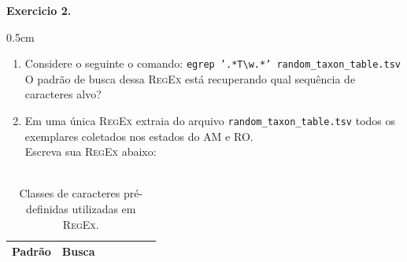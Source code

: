 \begin{refsection}
\begin{blackBlock}{\textbf{Exercicio 2.}}
\begin {myindentpar}{0.5cm}
\begin{enumerate}[\itshape i.]
 \item{Considere o seguinte o comando: \texttt{egrep '.*T\textbackslash w.*' random\_taxon\_table.tsv}}\label{tut2:regex:modifiers:ex2}\\
	O padrão de busca dessa \textsc{RegEx} está recuperando qual sequência de caracteres alvo?\\

 \item{Em uma única \textsc{RegEx} extraia do arquivo \texttt{random\_taxon\_table.tsv} todos os exemplares coletados nos estados do AM e RO.}\label{tut2:regex:modifiers:ex3}\\
	Escreva sua \textsc{RegEx} abaixo:\\

\\

\end{enumerate}
\end{myindentpar}
\end{blackBlock}

\pagestyle{fancy}
\begin{center}

\begin{longtable}{lllllll}
\caption[Tabela \ref{tut2:table:classes}:Classes de caracteres pré-definidas utilizadas em \textsc{RegEx}]{Classes de caracteres pré-definidas utilizadas em \textsc{RegEx}.} \label{tut2:table:classes} \\


\hline\hline \textbf{Padrão} & \textbf{Busca}\\
\endfirsthead


\end{longtable}
\end{center}
\end{refsection}
